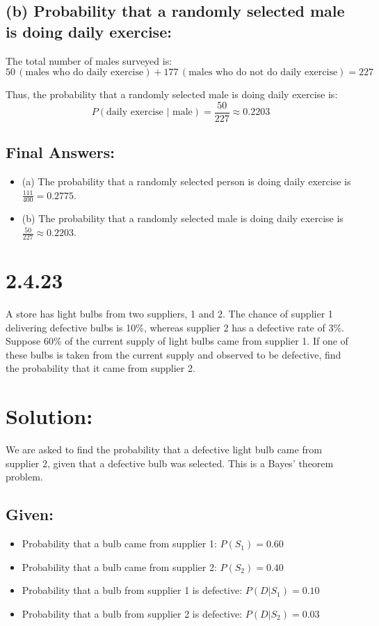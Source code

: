 \documentclass{article}
\begin{document}
\subsection*{(b) Probability that a randomly selected male is doing daily exercise:}

The total number of males surveyed is:
\[
50 \, (\text{males who do daily exercise}) + 177 \, (\text{males who do not do daily exercise}) = 227
\]

Thus, the probability that a randomly selected male is doing daily exercise is:
\[
P(\text{daily exercise | male}) = \frac{50}{227} \approx 0.2203
\]

\subsection*{Final Answers:}
\begin{itemize}
    \item (a) The probability that a randomly selected person is doing daily exercise is \( \frac{111}{400} = 0.2775 \).
    \item (b) The probability that a randomly selected male is doing daily exercise is \( \frac{50}{227} \approx 0.2203 \).
\end{itemize}

\section*{2.4.23}

A store has light bulbs from two suppliers, 1 and 2. The chance of supplier 1 delivering defective bulbs is 10\%, whereas supplier 2 has a defective rate of 3\%. Suppose 60\% of the current supply of light bulbs came from supplier 1. If one of these bulbs is taken from the current supply and observed to be defective, find the probability that it came from supplier 2.

\section*{Solution:}

We are asked to find the probability that a defective light bulb came from supplier 2, given that a defective bulb was selected. This is a Bayes' theorem problem.

\subsection*{Given:}
\begin{itemize}
    \item Probability that a bulb came from supplier 1: \( P(S_1) = 0.60 \)
    \item Probability that a bulb came from supplier 2: \( P(S_2) = 0.40 \)
    \item Probability that a bulb from supplier 1 is defective: \( P(D|S_1) = 0.10 \)
    \item Probability that a bulb from supplier 2 is defective: \( P(D|S_2) = 0.03 \)
\end{itemize}
\end{document}
